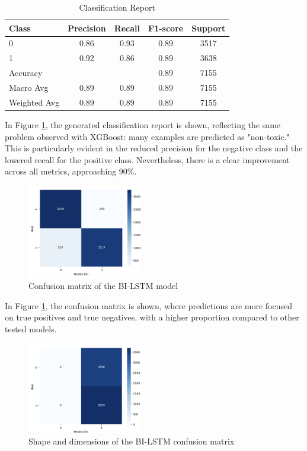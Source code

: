 \begin{table}[H]
\centering
\caption{Classification Report}
\label{tab:classification_report}
\begin{tabular}{lcccc}
\toprule
Class        & Precision & Recall & F1-score & Support \\
\midrule
0            & 0.86      & 0.93   & 0.89     & 3517    \\
1            & 0.92      & 0.86   & 0.89     & 3638    \\
\midrule
Accuracy     &           &        & 0.89     & 7155    \\
Macro Avg    & 0.89      & 0.89   & 0.89     & 7155    \\
Weighted Avg & 0.89      & 0.89   & 0.89     & 7155    \\
\bottomrule
\end{tabular}
\end{table}

In Figure \ref{fig:confusion_matrix_bilstm}, the generated classification report is shown, reflecting the same problem observed with XGBoost: many examples are predicted as "non-toxic." This is particularly evident in the reduced precision for the negative class and the lowered recall for the positive class. Nevertheless, there is a clear improvement across all metrics, approaching 90\%.

\begin{figure}[H]
    \centering
    \includegraphics[width=0.45\textwidth]{images/confusion_matrix_bilstm.png}
    \caption{Confusion matrix of the BI-LSTM model}
    \label{fig:confusion_matrix_bilstm}
\end{figure}

In Figure \ref{fig:confusion_matrix_bilstm}, the confusion matrix is shown, where predictions are more focused on true positives and true negatives, with a higher proportion compared to other tested models.

\begin{figure}[H]
    \centering
    \includegraphics[width=0.45\textwidth]{images/confusion_matrix_bilstm_shapeY.png}
    \caption{Shape and dimensions of the BI-LSTM confusion matrix}
    \label{fig:confusion_matrix_bilstm_shapeY}
\end{figure}
